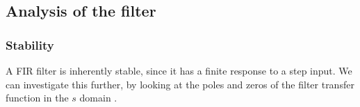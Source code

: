 
\subsection{Analysis of the filter}

\subsubsection{Stability}
A FIR filter is inherently stable, since it has a finite response to a step input. We can investigate this further, by looking at the poles and zeros of the filter transfer function in the $s$ domain . 